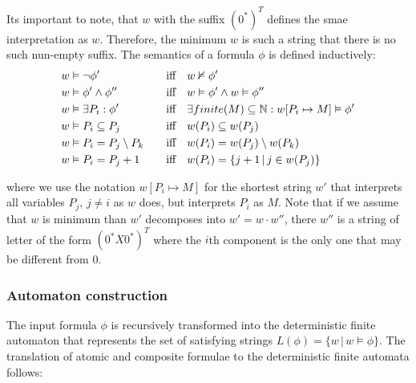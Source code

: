 \documentclass[pdflatex,sn-mathphys-num]{sn-jnl}%
\theoremstyle{thmstyleone}%
\theoremstyle{thmstyletwo}%
\theoremstyle{thmstylethree}%
\begin{document}
            \noindent Its important to note, that $w$ with the suffix $(0^*)^T$ defines the smae interpretation as $w$. Therefore, the minimum $w$ is such a string that there is no such nun-empty suffix. The semantics of a formula $\phi$ is defined inductively:
                \begin{alignat*}{2}
                    &w \vDash \neg \phi' \quad && \textnormal{iff}\quad  w \nvDash \phi'\\
                    &w \vDash \phi' \land \phi'' \quad &&\textnormal{iff}\quad  w \vDash \phi' \land w \vDash \phi''\\
                    &w \vDash \exists P_i : \phi' \quad &&\textnormal{iff}\quad  \exists finite(M) \subseteq \mathbb{N} : w[P_i \mapsto M] \vDash \phi'\\
                    &w \vDash P_i \subseteq P_j \quad &&\textnormal{iff}\quad  w(P_i) \subseteq w(P_j)\\
                    &w \vDash P_i = P_j \setminus P_k \quad &&\textnormal{iff}\quad  w(P_i) = w(P_j) \setminus w(P_k)\\
                    &w \vDash P_i = P_j + 1 \quad &&\textnormal{iff}\quad  w(P_i) = \{j + 1\,|\, j \in w(P_j)\}
                \end{alignat*}

            where we use the notation $w[P_i \mapsto M]$ for the shortest string $w'$ that interprets all variables $P_j$, $j \neq i$ as $w$ does, but interprets $P_i$ as $M$. Note that if we assume that $w$ is minimum than $w'$ decomposes into $w' = w \cdot w''$, there $w''$ is a string of letter of the form $(0^*X0^*)^T$ where the $i$th component is the only one that may be different from 0.

        \subsubsection*{Automaton construction}
            The input formula $\phi$ is recursively transformed into the deterministic finite automaton that represents the set of satisfying strings $L(\phi) = \{w\,|\, w \vDash \phi\}$. The translation of atomic and composite formulae to the deterministic finite automata follows:

            \vspace*{0.5em}
\end{document}
